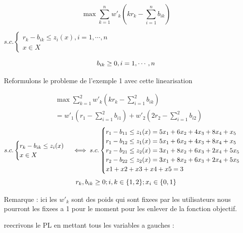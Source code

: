 \documentclass[16pt, a4paper]{article}
\begin{document}
\begin{flushleft}
\begin{justify}
$$\max \sum_{k=1}^n w'_k(kr_k- \sum_{i=1}^n b_{ik})$$
\begin{center}
\begin{math}
s.c. \begin{cases}
    r_k - b_{ik} \leq z_i(x) , i = 1,\cdots,n\\
    x \in X
    \end{cases}
\end{math}
\end{center}
$$b_{ik} \geq 0 , i = 1,\cdots,n\\$$

Reformulons le probleme de l'exemple 1 avec cette linearisation


\begin{align*}
&\max \sum_{k=1}^2 w'_k(kr_k- \sum_{i=1}^2 b_{ik})\\
& = w'_1(r_1- \sum_{i=1}^2 b_{i1}) + w'_2(2r_2- \sum_{i=1}^2 b_{i2})\\
\end{align*}
\begin{math}
s.c. \begin{cases}
    r_k - b_{ik} \leq z_i(x)\\
    x \in X
\end{cases} 
\iff
s.c. \begin{cases}
    r_1 - b_{11} \leq z_1(x) = 5x_1 + 6x_2 + 4x_3 + 8x_4 +x_5 \\
    r_1 - b_{12} \leq z_1(x) = 5x_1 + 6x_2 + 4x_3 + 8x_4 +x_5  \\
    r_2 - b_{21} \leq z_2(x) = 3x_1 + 8x_2 + 6x_3 + 2x_4 + 5x_5 \\
    r_2 - b_{22} \leq z_2(x) = 3x_1 + 8x_2 + 6x_3 + 2x_4 + 5x_5 \\
    x1 + x2 + x3 +x4 + x5 = 3
\end{cases}\\
\end{math}
$$r_{k}, b_{ik} \geq 0 ; i,k\in \{1,2\} ; x_i \in \{0,1\}\\$$

Remarque : ici les $w'_k$ sont des poids qui sont fixees par les utilisateurs nous pourront les fixees a 1 pour le moment pour les enlever de la fonction objectif. 

reecrivons le PL en mettant tous les variables a gauches : 


\end{justify}
\end{flushleft}
\end{document}
